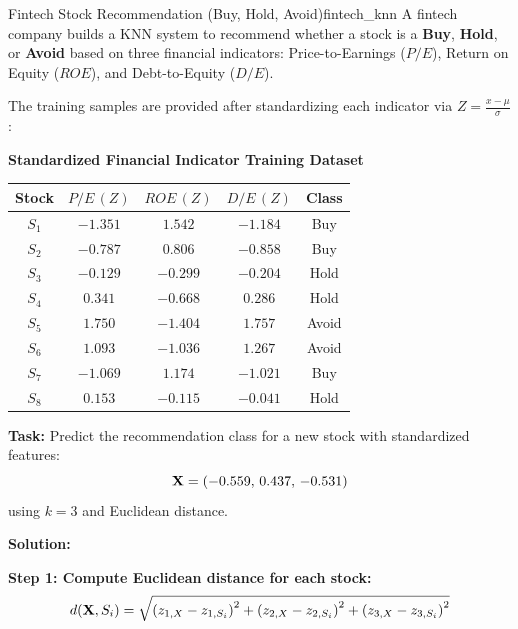 \begin{example}{Fintech Stock Recommendation (Buy, Hold, Avoid)}{fintech_knn}
A fintech company builds a KNN system to recommend whether a stock is a \textbf{Buy}, \textbf{Hold}, or \textbf{Avoid} based on three financial indicators: Price-to-Earnings ($P/E$), Return on Equity ($ROE$), and Debt-to-Equity ($D/E$).

The training samples are provided after standardizing each indicator via $Z = \frac{x - \mu}{\sigma}$:

\begin{center}
\textbf{Standardized Financial Indicator Training Dataset}\\[0.3em]
\begin{tabular}{ccccc}
\toprule
\textbf{Stock} & $P/E\,(Z)$ & $ROE\,(Z)$ & $D/E\,(Z)$ & \textbf{Class} \\
\midrule
$S_1$ & $-1.351$ & $1.542$ & $-1.184$ & Buy \\
$S_2$ & $-0.787$ & $0.806$ & $-0.858$ & Buy \\
$S_3$ & $-0.129$ & $-0.299$ & $-0.204$ & Hold \\
$S_4$ & $0.341$ & $-0.668$ & $0.286$ & Hold \\
$S_5$ & $1.750$ & $-1.404$ & $1.757$ & Avoid \\
$S_6$ & $1.093$ & $-1.036$ & $1.267$ & Avoid \\
$S_7$ & $-1.069$ & $1.174$ & $-1.021$ & Buy \\
$S_8$ & $0.153$ & $-0.115$ & $-0.041$ & Hold \\
\bottomrule
\end{tabular}
\end{center}

\noindent\textbf{Task:} Predict the recommendation class for a new stock with standardized features:
$$\mathbf{X} = (-0.559,\, 0.437,\, -0.531)$$
using $k = 3$ and Euclidean distance.

\tcblower
\textbf{Solution:}

\noindent\textbf{Step 1: Compute Euclidean distance for each stock:}
$$d(\mathbf{X}, S_i) = \sqrt{\left(z_{1, X} - z_{1, S_i}\right)^2 + \left(z_{2, X} - z_{2, S_i}\right)^2 + \left(z_{3, X} - z_{3, S_i}\right)^2}$$


\end{example}
